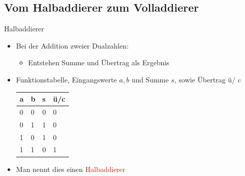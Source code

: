 \documentclass[12pt%
,xcolor=table
,aspectratio=169%
]{beamer}
\begin{document}
\subsection{Vom Halbaddierer zum Volladdierer}
\begin{frame}{Halbaddierer}
\begin{itemize}
	\item Bei der Addition zweier Dualzahlen: 
	\begin{itemize}
		\item Entstehen Summe und Übertrag als Ergebnis
	\end{itemize}
	\item Funktionstabelle, Eingangswerte $a,b$ und Summe $s$, sowie Übertrag ü/ $c$
	\begin{table}[]
\begin{tabular}{l|l|l|l}
a & b & s & ü/c \\ \hline
0 & 0 & 0 & 0 \\
0 & 1 & 1 & 0 \\
1 & 0 & 1 & 0 \\
1 & 1 & 0 & 1
\end{tabular}
\end{table}
	\item Man nennt dies einen \textcolor{red}{Halbaddierer}
\end{itemize}
\end{frame}
\end{document}
